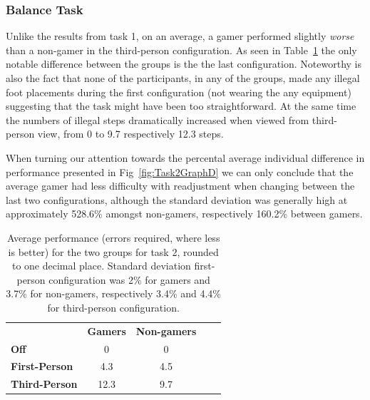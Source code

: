 \documentclass[runningheads,a4paper,oribibl]{llncs}
\begin{document}
\subsubsection{Balance Task}
Unlike the results from task 1, on an average, a gamer performed slightly \emph{worse} than a non-gamer in the third-person configuration. As seen in Table~\ref{tab:Task2GraphP} the only notable difference between the groups is the the last configuration. Noteworthy is also the fact that none of the participants, in any of the groups, made any illegal foot placements during the first configuration (not wearing the any equipment) suggesting that the task might have been too straightforward. At the same time the numbers of illegal steps dramatically increased when viewed from third-person view, from 0 to 9.7 respectively 12.3 steps.  

When turning our attention towards the percental average individual difference in performance presented in Fig~\ref{fig:Task2GraphD} we can only conclude that the average gamer had less difficulty with readjustment when changing between the last two configurations, although the standard deviation was generally high at approximately 528.6\% amongst non-gamers, respectively 160.2\% between gamers.


\begin{table}[]
\centering
\label{tab:Task2GraphP}
\setlength{\tabcolsep}{1em}
\def\arraystretch{1.8}
\begin{tabular}{l|c|cll}
                      & {\textbf{Gamers}} & {\textbf{Non-gamers}} &  &  \\ \cline{1-3}
\textbf{Off}          & 0                                    & 0                                          &  &  \\ \cline{1-3}
\textbf{First-Person} & 4.3                                   & 4.5                                        &  &  \\ \cline{1-3}
\textbf{Third-Person} & 12.3                                    & 9.7                                        &  & 
\end{tabular}
\caption{Average performance (errors required, where less is better) for the two groups for task 2, rounded to one decimal place. Standard deviation first-person configuration was 2\% for gamers and 3.7\% for non-gamers, respectively 3.4\% and 4.4\% for third-person configuration.}
\end{table}
\end{document}
